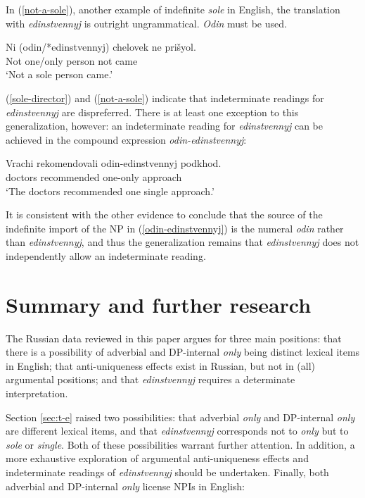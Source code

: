 \documentclass{article}
\begin{document}

In (\ref{not-a-sole}), another example of indefinite \textit{sole} in English, the translation with \textit{edinstvennyj} is outright ungrammatical. \textit{Odin} must be used.

\begin{exe}
	\ex \label{not-a-sole} \gll Ni (odin/*edinstvennyj) chelovek ne pri\v{s}yol.\\
	Not one/only person not came\\
	\glt `Not a sole person came.'
\end{exe}

(\ref{sole-director}) and (\ref{not-a-sole}) indicate that indeterminate readings for \textit{edinstvennyj} are dispreferred. There is at least one exception to this generalization, however: an indeterminate reading for \textit{edinstvennyj} can be achieved in the compound expression \textit{odin-edinstvennyj}:

\begin{exe}
	\ex \label{odin-edinstvennyj} \gll Vrachi rekomendovali odin-edinstvennyj podkhod.\\
	doctors recommended one-only approach\\
	`The doctors recommended one single approach.'
\end{exe}

It is consistent with the other evidence to conclude that the source of the indefinite import of the NP in (\ref{odin-edinstvennyj}) is the numeral \textit{odin} rather than \textit{edinstvennyj}, and thus the generalization remains that \textit{edinstvennyj} does not independently allow an indeterminate reading.

\section{Summary and further research \label{sec:conclusion}}
The Russian data reviewed in this paper argues for three main positions: that there is a possibility of adverbial and DP-internal \textit{only} being distinct lexical items in English; that anti-uniqueness effects exist in Russian, but not in (all) argumental positions; and that \textit{edinstvennyj} requires a determinate interpretation.

Section \ref{sec:t-e} raised two possibilities: that adverbial \textit{only} and DP-internal \textit{only} are different lexical items, and that \textit{edinstvennyj} corresponds not to \textit{only} but to \textit{sole} or \textit{single}. Both of these possibilities warrant further attention. In addition, a more exhaustive exploration of argumental anti-uniqueness effects and indeterminate readings of \textit{edinstvennyj} should be undertaken. Finally, both adverbial and DP-internal \textit{only} license NPIs in English:
\end{document}
